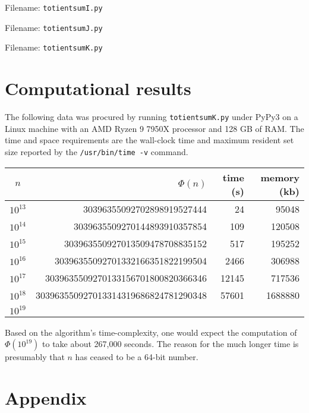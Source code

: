\documentclass[12pt]{article}
\begin{document}
Filename: \texttt{totientsumI.py}
%

Filename: \texttt{totientsumJ.py}
%

Filename: \texttt{totientsumK.py}
%

\section{Computational results}

The following data was procured by running \texttt{totientsumK.py} under PyPy3 on a Linux machine with an AMD Ryzen 9 7950X processor and 128 GB of RAM.  The time and space requirements are the wall-clock time and maximum resident set size reported by the \texttt{/usr/bin/time -v} command.

\begin{tabular}{|c|r|r|r|} \hline
$n$ & $\Phi(n)$ & time (s) & memory (kb) \\\hline
$10^{13}$ & 30396355092702898919527444 & 24 & 95048 \\\hline
$10^{14}$ & 3039635509270144893910357854 & 109 & 120508 \\\hline
$10^{15}$ & 303963550927013509478708835152 & 517 & 195252 \\\hline
$10^{16}$ & 30396355092701332166351822199504 & 2466 & 306988\\\hline
$10^{17}$ & 3039635509270133156701800820366346 & 12145 & 717536 \\\hline
$10^{18}$ & 303963550927013314319686824781290348 & 57601 & 1688880 \\\hline
$10^{19}$ &  &  &  \\\hline
\end{tabular}

Based on the algorithm's time-complexity, one would expect the computation of $\Phi(10^{19})$ to take about 267,000 seconds.  The reason for the much longer time is presumably that $n$ has ceased to be a 64-bit number.

\section{Appendix}
\end{document}
